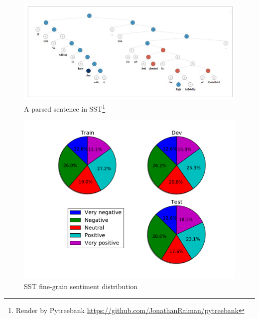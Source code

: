 \begin{figure}[H]
    \begin{minipage}{\textwidth}
        \centering
        \includegraphics[width=0.9\linewidth]{figure/sst}
        \caption[A parsed sentence in SST]{A parsed sentence in SST\footnote{Render by Pytreebank \url{https://github.com/JonathanRaiman/pytreebank}}}
        \label{fig:sst_5}
    \end{minipage}
\end{figure}

\begin{figure}[H]
    \begin{minipage}{\textwidth}
        \centering
        \includegraphics[width=0.9\linewidth]{figure/sstfinegrain}
        \caption[SST fine-grain sentiment distribution]{SST fine-grain sentiment distribution}
        \label{fig:sstfinegrain_5}
    \end{minipage}
\end{figure}

